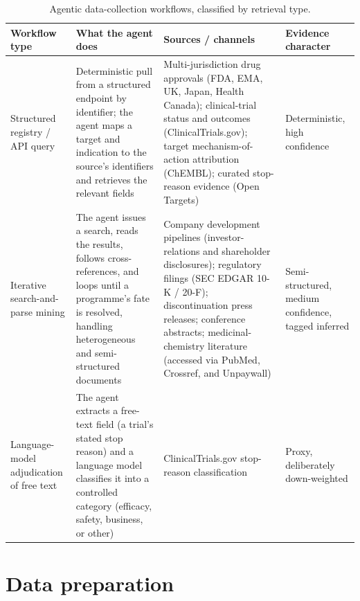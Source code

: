 \documentclass[11pt,twocolumn]{article}
\begin{document}
\begin{table}[t]
\centering
\caption{Agentic data-collection workflows, classified by retrieval type.}
\label{tab:1}
\footnotesize
\begin{tabular}{p{}p{}p{}p{}}
\toprule
Workflow type & What the agent does & Sources / channels & Evidence character \\
\midrule
Structured registry / API query & Deterministic pull from a structured endpoint by identifier; the agent maps a target and indication to the source's identifiers and retrieves the relevant fields & Multi-jurisdiction drug approvals (FDA,\cite{ref70} EMA,\cite{ref71} UK,\cite{ref72} Japan,\cite{ref73} Health Canada\cite{ref74}); clinical-trial status and outcomes (ClinicalTrials.gov)\cite{ref40}; target mechanism-of-action attribution (ChEMBL)\cite{ref41}; curated stop-reason evidence (Open Targets)\cite{ref42} & Deterministic, high confidence \\
Iterative search-and-parse mining & The agent issues a search, reads the results, follows cross-references, and loops until a programme's fate is resolved, handling heterogeneous and semi-structured documents & Company development pipelines (investor-relations and shareholder disclosures); regulatory filings (SEC EDGAR 10-K / 20-F)\cite{ref75}; discontinuation press releases; conference abstracts; medicinal-chemistry literature (accessed via PubMed,\cite{ref76} Crossref,\cite{ref77} and Unpaywall\cite{ref78}) & Semi-structured, medium confidence, tagged inferred \\
Language-model adjudication of free text & The agent extracts a free-text field (a trial's stated stop reason) and a language model classifies it into a controlled category (efficacy, safety, business, or other) & ClinicalTrials.gov stop-reason classification\cite{ref40} & Proxy, deliberately down-weighted \\
\bottomrule
\end{tabular}
\end{table}

\section{Data preparation}
\end{document}
